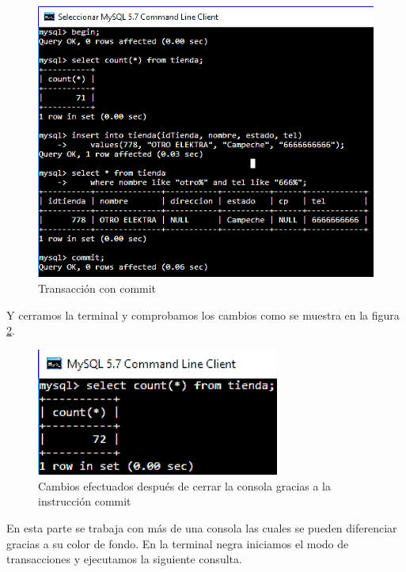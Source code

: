 \documentclass[12pt, titlepage]{article}
\begin{document}
	\begin{figure}[H]
		\begin{center}
			\includegraphics[width=\textwidth]{img/cuatro.png}
			\caption{Transacción con commit}
			\label{fig:cuatro}
		\end{center}
	\end{figure}

	Y cerramos la terminal y comprobamos los cambios como se muestra en la figura \ref{fig:cinco}.
	
	\begin{figure}[H]
		\begin{center}
			\includegraphics[width=8cm]{img/cinco.png}
			\caption{Cambios efectuados después de cerrar la consola gracias a la instrucción commit}
			\label{fig:cinco}
		\end{center}
	\end{figure}
	
	
	En esta parte se trabaja con más de una consola las cuales se pueden diferenciar gracias a su color de fondo.
	En la terminal negra iniciamos el modo de transacciones y ejecutamos la siguiente consulta.
	
\end{document}
